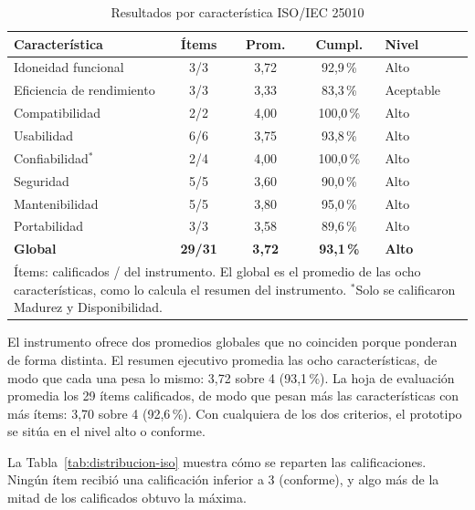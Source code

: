 \documentclass[conference]{IEEEtran}
\begin{document}
\begin{table}[htbp]
\caption{Resultados por característica ISO/IEC 25010}
\label{tab:resumen-iso}
\centering
\footnotesize
\setlength{\tabcolsep}{3pt}
\begin{tabular}{|p{2.45cm}|c|c|c|p{1.35cm}|}
\hline
\textbf{Característica} & \textbf{Ítems} & \textbf{Prom.} & \textbf{Cumpl.} & \textbf{Nivel} \\
\hline
Idoneidad funcional & 3/3 & 3,72 & 92,9\,\% & Alto \\
\hline
Eficiencia de rendimiento & 3/3 & 3,33 & 83,3\,\% & Aceptable \\
\hline
Compatibilidad & 2/2 & 4,00 & 100,0\,\% & Alto \\
\hline
Usabilidad & 6/6 & 3,75 & 93,8\,\% & Alto \\
\hline
Confiabilidad$^{\ast}$ & 2/4 & 4,00 & 100,0\,\% & Alto \\
\hline
Seguridad & 5/5 & 3,60 & 90,0\,\% & Alto \\
\hline
Mantenibilidad & 5/5 & 3,80 & 95,0\,\% & Alto \\
\hline
Portabilidad & 3/3 & 3,58 & 89,6\,\% & Alto \\
\hline
\textbf{Global} & \textbf{29/31} & \textbf{3,72} & \textbf{93,1\,\%} & \textbf{Alto} \\
\hline
\multicolumn{5}{|p{7.2cm}|}{\scriptsize Ítems: calificados / del instrumento. El global es el promedio de las ocho características, como lo calcula el resumen del instrumento. $^{\ast}$Solo se calificaron Madurez y Disponibilidad.} \\
\hline
\end{tabular}
\end{table}

El instrumento ofrece dos promedios globales que no coinciden porque
ponderan de forma distinta. El resumen ejecutivo promedia las ocho
características, de modo que cada una pesa lo mismo: 3,72 sobre 4
(93,1\,\%). La hoja de evaluación promedia los 29 ítems calificados, de
modo que pesan más las características con más ítems: 3,70 sobre 4
(92,6\,\%). Con cualquiera de los dos criterios, el prototipo se sitúa en
el nivel alto o conforme.

La Tabla~\ref{tab:distribucion-iso} muestra cómo se reparten las
calificaciones. Ningún ítem recibió una calificación inferior a 3
(conforme), y algo más de la mitad de los calificados obtuvo la máxima.
\end{document}
